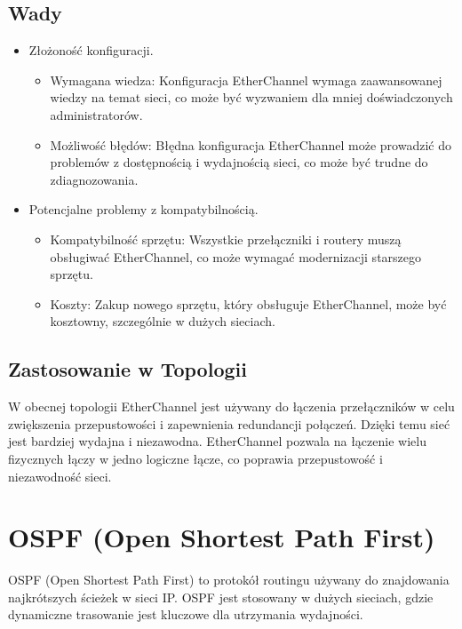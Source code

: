 \subsection{Wady}
\begin{itemize}
    \item Złożoność konfiguracji.
    \begin{itemize}
        \item Wymagana wiedza: Konfiguracja EtherChannel wymaga zaawansowanej wiedzy na temat sieci, co może być wyzwaniem dla mniej doświadczonych administratorów.
        \item Możliwość błędów: Błędna konfiguracja EtherChannel może prowadzić do problemów z dostępnością i wydajnością sieci, co może być trudne do zdiagnozowania.
    \end{itemize}
    \item Potencjalne problemy z kompatybilnością.
    \begin{itemize}
        \item Kompatybilność sprzętu: Wszystkie przełączniki i routery muszą obsługiwać EtherChannel, co może wymagać modernizacji starszego sprzętu.
        \item Koszty: Zakup nowego sprzętu, który obsługuje EtherChannel, może być kosztowny, szczególnie w dużych sieciach.
    \end{itemize}
\end{itemize}

\subsection{Zastosowanie w Topologii}
W obecnej topologii EtherChannel jest używany do łączenia przełączników w celu zwiększenia przepustowości i zapewnienia redundancji połączeń. Dzięki temu sieć jest bardziej wydajna i niezawodna. EtherChannel pozwala na łączenie wielu fizycznych łączy w jedno logiczne łącze, co poprawia przepustowość i niezawodność sieci.

\section{OSPF (Open Shortest Path First)}

OSPF (Open Shortest Path First) to protokół routingu używany do znajdowania najkrótszych ścieżek w sieci IP. OSPF jest stosowany w dużych sieciach, gdzie dynamiczne trasowanie jest kluczowe dla utrzymania wydajności.

